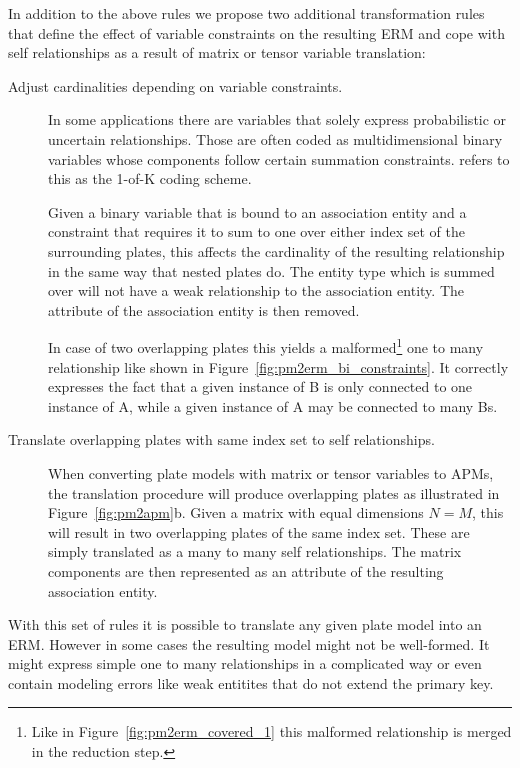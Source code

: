 In addition to the above rules we propose two additional transformation rules that define the effect of variable constraints on the resulting ERM and cope with self relationships as a result of matrix or tensor variable translation:

\begin{description}
\item[Adjust cardinalities depending on variable constraints.] In some applications there are variables that solely express probabilistic or uncertain relationships. Those are often coded as multidimensional binary variables whose components follow certain summation constraints. \textcite{bishop2006pattern} refers to this as the 1-of-K coding scheme.

Given a binary variable that is bound to an association entity and a constraint that requires it to sum to one over either index set of the surrounding plates, this affects the cardinality of the resulting relationship in the same way that nested plates do. The entity type which is summed over will not have a weak relationship to the association entity. The attribute of the association entity is then removed.

In case of two overlapping plates this yields a malformed\footnote{Like in Figure~\ref{fig:pm2erm_covered_1} this malformed relationship is merged in the reduction step.} one to many relationship like shown in Figure~\ref{fig:pm2erm_bi_constraints}. It correctly expresses the fact that a given instance of B is only connected to one instance of A, while a given instance of A may be connected to many Bs.

\item[Translate overlapping plates with same index set to self relationships.] When converting plate models with matrix or tensor variables to APMs, the translation procedure will produce overlapping plates as illustrated in Figure~\ref{fig:pm2apm}b. Given a matrix with equal dimensions $N = M$, this will result in two overlapping plates of the same index set. These are simply translated as a many to many self relationships. The matrix components are then represented as an attribute of the resulting association entity.
\end{description}

With this set of rules it is possible to translate any given plate model into an ERM. However in some cases the resulting model might not be well-formed. It might express simple one to many relationships in a complicated way or even contain modeling errors like weak entitites that do not extend the primary key.


